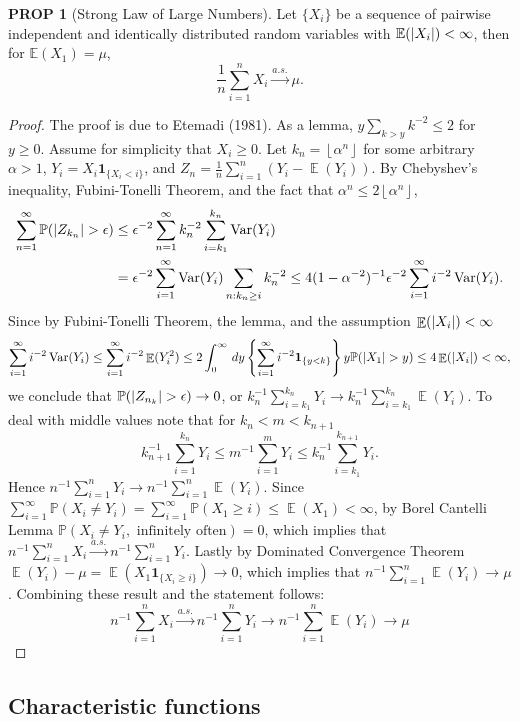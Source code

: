 \documentclass[hidelinks,11pt]{article}
\theoremstyle{definition}
\theoremstyle{dotles}
\theoremstyle{dotless}
\newtheorem{prop}{PROP}[section]
\theoremstyle{remark}
\DeclareMathOperator{\Var}{Var}
\DeclareMathOperator{\E}{\mathbb{E}}
\begin{document}
\begin{prop}[Strong Law of Large Numbers]
Let $\{X_i\}$ be a sequence of pairwise independent and identically distributed random variables with $\mathbb{E}(\abs{X_i})<\infty$, then for $\mathbb{E}(X_1)=\mu$,
\[\frac{1}{n}\sum_{i=1}^nX_i\xrightarrow{a.s.}\mu.\]
\end{prop}
\begin{proof}
The proof is due to Etemadi (1981). As a lemma, $y\sum_{k>y}k^{-2}\leq2$ for $y\geq0$.\smallbreak
Assume for simplicity that $X_i\geq0$. Let $k_n=\left\lfloor{\alpha^n}\right\rfloor$ for some arbitrary $\alpha>1$, $Y_i=X_i\textbf{1}_{\{X_i<i\}}$, and $Z_n=\frac{1}{n}\sum_{i=1}^n(Y_i-\E(Y_i))$.\smallbreak
By Chebyshev's inequality,  Fubini-Tonelli Theorem, and the fact that $\alpha^n\leq2\left\lfloor{\alpha^n}\right\rfloor$,
\begin{align*}
\sum_{n=1}^\infty\mathbb{P}(\abs{Z_{k_n}}>\epsilon)&\leq\epsilon^{-2}\sum_{n=1}^\infty k_n^{-2}\sum_{i=k_1}^{k_n}\Var(Y_i)\\
&=\epsilon^{-2}\sum_{i=1}^\infty\Var(Y_i)\sum_{n:k_n\geq i}k_n^{-2}\leq4(1-\alpha^{-2})^{-1}\epsilon^{-2}\sum_{i=1}^\infty i^{-2}\Var(Y_i).
\end{align*}
Since by Fubini-Tonelli Theorem, the lemma, and the assumption $\E(\abs{X_i})<\infty$
\[\sum_{i=1}^\infty i^{-2}\Var(Y_i)\leq\sum_{i=1}^\infty i^{-2}\E(Y_i^2)\leq2\int_0^\infty\,dy\left\{\sum_{i=1}^\infty i^{-2}\textbf{1}_{\{y<k\}}\right\}y\mathbb{P}(\abs{X_1}>y)\leq4\E(\abs{X_i})<\infty,\]
we conclude that $\mathbb{P}(\abs{Z_{n_k}}>\epsilon)\to0$, or $k_n^{-1}\sum_{i=k_1}^{k_n}Y_i\to k_n^{-1}\sum_{i=k_1}^{k_n}\E(Y_i)$. To deal with middle values note that for $k_n<m<k_{n+1}$
\[k_{n+1}^{-1}\sum_{i=1}^{k_n}Y_i\leq m^{-1}\sum_{i=1}^mY_i\leq k_n^{-1}\sum_{i=k_1}^{k_{n+1}}Y_i.\]
Hence $n^{-1}\sum_{i=1}^nY_i\to n^{-1}\sum_{i=1}^n\E(Y_i)$.\smallbreak
Since $\sum_{i=1}^\infty\mathbb{P}(X_i\neq Y_i)=\sum_{i=1}^\infty\mathbb{P}(X_1\geq i)\leq\E(X_1)<\infty$, by Borel Cantelli Lemma $\mathbb{P}(X_i\neq Y_i,\textrm{ infinitely often})=0$, which implies that $n^{-1}\sum_{i=1}^nX_i\xrightarrow{a.s.}n^{-1}\sum_{i=1}^nY_i$.\smallbreak
Lastly by Dominated Convergence Theorem $\E(Y_i)-\mu=\E(X_1\textbf{1}_{\{X_i\geq i\}})\to0$, which implies that $n^{-1}\sum_{i=1}^n\E(Y_i)\to\mu$. Combining these result and the statement follows:
\[n^{-1}\sum_{i=1}^nX_i\xrightarrow{a.s.}n^{-1}\sum_{i=1}^nY_i\to n^{-1}\sum_{i=1}^n\E(Y_i)\to\mu\]
\end{proof}

\bigbreak
\subsection{Characteristic functions}
\end{document}
